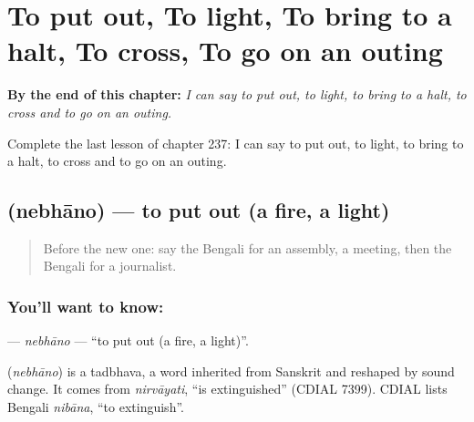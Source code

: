 
\chapter{To put out, To light, To bring to a halt, To cross, To go on an outing}
\label{ch:bn-to-put-out-to-light-to-bring-to-a-halt-to-cross-to-go-on-an-outing}

\begin{chapteropening}
\textbf{By the end of this chapter:} \emph{I can say to put out, to light, to bring to a halt, to cross and to go on an outing.}

Complete the last lesson of chapter 237: I can say to put out, to light, to bring to a halt, to cross and to go on an outing.
\end{chapteropening}

\section[\texorpdfstring{\bn{নেভানো} (nebhāno)}{নেভানো (nebhāno)}]{ (nebhāno) — to put out (a fire, a light)}

\label{lesson:BN-C237-nebhano}



\begin{quote}
Before the new one: say the Bengali for an assembly, a meeting, then the Bengali for a journalist.
\end{quote}

\subsection*{You'll want to know: }
\textbf{} — \emph{nebhāno} — \textquotedblleft{}to put out (a fire, a light)\textquotedblright{}.

\begin{cousinweb}
\textbf{} (\emph{nebhāno}) is a tadbhava, a word inherited from Sanskrit and reshaped by sound change. It comes from \emph{nirvāyati}, \textquotedblleft{}is extinguished\textquotedblright{} (CDIAL 7399). CDIAL lists Bengali \emph{nibāna}, \textquotedblleft{}to extinguish\textquotedblright{}.
\end{cousinweb}

